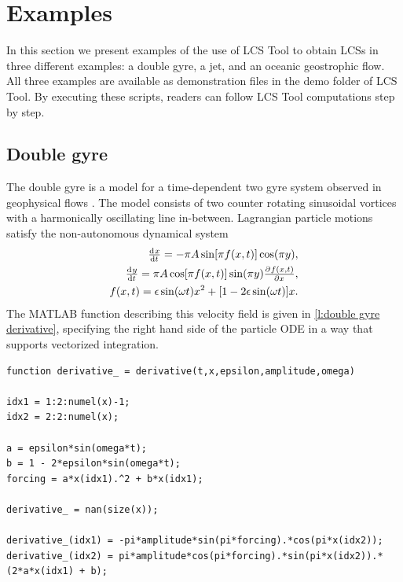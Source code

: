 \documentclass{elsarticle}
\begin{document}
\section{Examples}

In this section we present examples of the use of LCS Tool to obtain LCSs in three different examples: a double gyre, a jet, and an oceanic geostrophic flow. All three examples are available as demonstration files in the demo folder of LCS Tool. By executing these scripts, readers can follow LCS Tool computations step by step.

\subsection{Double gyre}
The double gyre is a model for a time-dependent two gyre system observed in geophysical flows \citep{shadden05:_defin_lagran_lyapun}. The model consists of two counter rotating sinusoidal vortices with a harmonically oscillating line in-between. Lagrangian particle motions satisfy the non-autonomous dynamical system
\begin{equation}
\begin{split}
\od{x}{t} = -\pi A \sin[\pi f(x,t)] \cos(\pi y),\\
\od{y}{t} = \pi A \cos[\pi f(x,t)] \sin(\pi y) \pd{f(x,t)}{x},\\
f(x,t) = \epsilon \sin(\omega t) x^2 + [1 - 2 \epsilon \sin(\omega t)] x.
\end{split}
\label{eq:double gyre derivative equations}
\end{equation}
The MATLAB function describing this velocity field is given in \cref{l:double gyre derivative}, specifying the right hand side of the particle ODE in a way that supports vectorized integration.

\begin{lstlisting}[caption={Double gyre derivative function corresponding to \cref{eq:double gyre derivative equations}.},label=l:double gyre derivative]
function derivative_ = derivative(t,x,epsilon,amplitude,omega)

idx1 = 1:2:numel(x)-1;
idx2 = 2:2:numel(x);

a = epsilon*sin(omega*t);
b = 1 - 2*epsilon*sin(omega*t);
forcing = a*x(idx1).^2 + b*x(idx1);

derivative_ = nan(size(x));

derivative_(idx1) = -pi*amplitude*sin(pi*forcing).*cos(pi*x(idx2));
derivative_(idx2) = pi*amplitude*cos(pi*forcing).*sin(pi*x(idx2)).*(2*a*x(idx1) + b);
\end{lstlisting}
\end{document}

